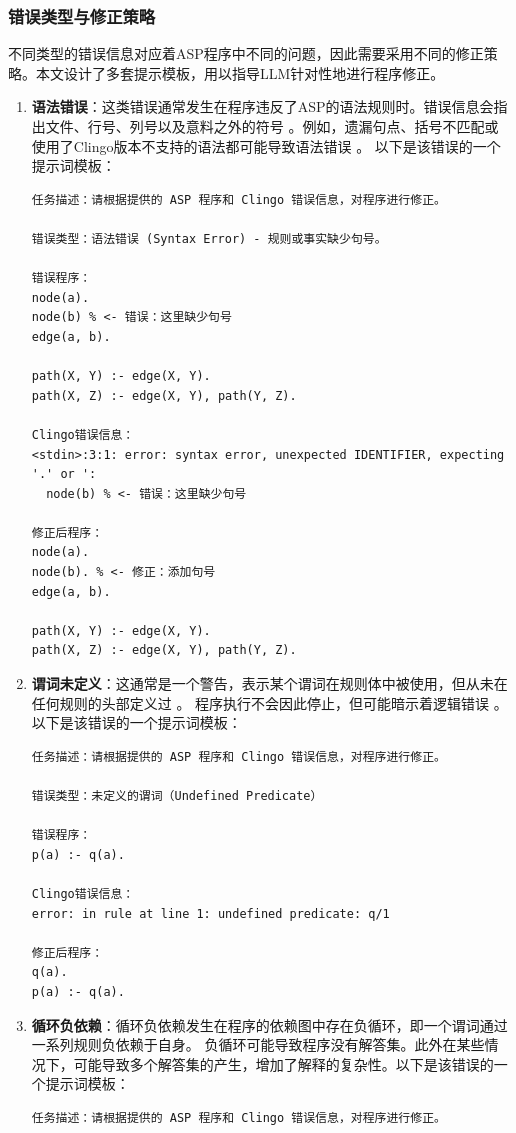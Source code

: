 \subsubsection{错误类型与修正策略}
不同类型的错误信息对应着ASP程序中不同的问题，因此需要采用不同的修正策略。本文设计了多套提示模板，用以指导LLM针对性地进行程序修正。
\begin{enumerate}[itemsep=0pt,parsep=0pt]
\item \textbf{语法错误}：这类错误通常发生在程序违反了ASP的语法规则时。错误信息会指出文件、行号、列号以及意料之外的符号 。例如，遗漏句点、括号不匹配或使用了Clingo版本不支持的语法都可能导致语法错误 。
以下是该错误的一个提示词模板：
\begin{lstlisting}
任务描述：请根据提供的 ASP 程序和 Clingo 错误信息，对程序进行修正。

错误类型：语法错误 (Syntax Error) - 规则或事实缺少句号。

错误程序：
node(a).
node(b) % <- 错误：这里缺少句号
edge(a, b).

path(X, Y) :- edge(X, Y).
path(X, Z) :- edge(X, Y), path(Y, Z).

Clingo错误信息：
<stdin>:3:1: error: syntax error, unexpected IDENTIFIER, expecting '.' or ':
  node(b) % <- 错误：这里缺少句号

修正后程序：
node(a).
node(b). % <- 修正：添加句号
edge(a, b).

path(X, Y) :- edge(X, Y).
path(X, Z) :- edge(X, Y), path(Y, Z).
\end{lstlisting}
\item \textbf{谓词未定义}：这通常是一个警告，表示某个谓词在规则体中被使用，但从未在任何规则的头部定义过 。
程序执行不会因此停止，但可能暗示着逻辑错误 。以下是该错误的一个提示词模板：
\begin{lstlisting}
任务描述：请根据提供的 ASP 程序和 Clingo 错误信息，对程序进行修正。

错误类型：未定义的谓词（Undefined Predicate）

错误程序：
p(a) :- q(a).

Clingo错误信息：
error: in rule at line 1: undefined predicate: q/1

修正后程序：
q(a).
p(a) :- q(a).
\end{lstlisting}
\item \textbf{循环负依赖}：循环负依赖发生在程序的依赖图中存在负循环，即一个谓词通过一系列规则负依赖于自身。
负循环可能导致程序没有解答集。​此外在某些情况下，可能导致多个解答集的产生，增加了解释的复杂性。以下是该错误的一个提示词模板：
\begin{lstlisting}
任务描述：请根据提供的 ASP 程序和 Clingo 错误信息，对程序进行修正。


\end{lstlisting}
\end{enumerate}
